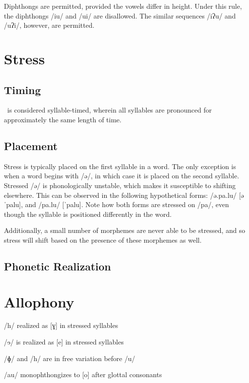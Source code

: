 Diphthongs are permitted, provided the vowels differ in height.
Under this rule, the diphthongs /iu/ and /ui/ are disallowed.
The similar sequences /iʔu/ and /uʔi/, however, are permitted.

\section{Stress}
\subsection{Timing}
\langname\ is considered syllable-timed, wherein all syllables are pronounced for approximately the same length of time.

\subsection{Placement}
Stress is typically placed on the first syllable in a word.
The only exception is when a word begins with /ə/, in which case it is placed on the second syllable.
Stressed /ə/ is phonologically unstable, which makes it susceptible to shifting elsewhere.
This can be observed in the following hypothetical forms: /ə.pa.lu/ [əˈpalu], and /pa.lu/ [ˈpalu].
Note how both forms are stressed on /pa/, even though the syllable is positioned differently in the word.

Additionally, a small number of morphemes are never able to be stressed, and so stress will shift based on the presence of these morphemes as well.

\subsection{Phonetic Realization}

\section{Allophony} %

/h/ realized as [ɣ] in stressed syllables


/ɘ/ is realized as [e] in stressed syllables


/ɸ/ and /h/ are in free variation before /u/

/au/ monophthongizes to [o] after glottal consonants

